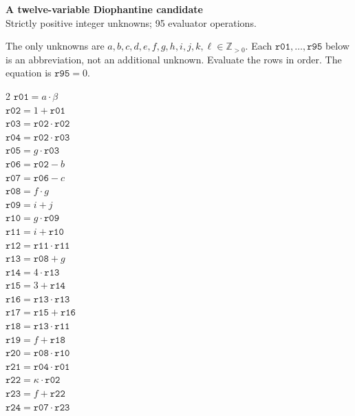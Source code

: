 \documentclass[9pt]{article}
\begin{document}
\begin{center}
{\large\bfseries A twelve-variable Diophantine candidate}\\
{\small Strictly positive integer unknowns; 95 evaluator operations.}
\end{center}
The only unknowns are \(a,b,c,d,e,f,g,h,i,j,k,\ell\in\mathbb Z_{>0}\).
Each \(\mathtt{r01},\ldots,\mathtt{r95}\) below is an abbreviation,
not an additional unknown. Evaluate the rows in order. The equation is
\(\boxed{\mathtt{r95}=0}\).

\begin{multicols}{2}\small
\(\mathtt{r01} = a \cdot \beta\)\\
\(\mathtt{r02} = 1 + \mathtt{r01}\)\\
\(\mathtt{r03} = \mathtt{r02} \cdot \mathtt{r02}\)\\
\(\mathtt{r04} = \mathtt{r02} \cdot \mathtt{r03}\)\\
\(\mathtt{r05} = g \cdot \mathtt{r03}\)\\
\(\mathtt{r06} = \mathtt{r02} - b\)\\
\(\mathtt{r07} = \mathtt{r06} - c\)\\
\(\mathtt{r08} = f \cdot g\)\\
\(\mathtt{r09} = i + j\)\\
\(\mathtt{r10} = g \cdot \mathtt{r09}\)\\
\(\mathtt{r11} = i + \mathtt{r10}\)\\
\(\mathtt{r12} = \mathtt{r11} \cdot \mathtt{r11}\)\\
\(\mathtt{r13} = \mathtt{r08} + g\)\\
\(\mathtt{r14} = 4 \cdot \mathtt{r13}\)\\
\(\mathtt{r15} = 3 + \mathtt{r14}\)\\
\(\mathtt{r16} = \mathtt{r13} \cdot \mathtt{r13}\)\\
\(\mathtt{r17} = \mathtt{r15} + \mathtt{r16}\)\\
\(\mathtt{r18} = \mathtt{r13} \cdot \mathtt{r11}\)\\
\(\mathtt{r19} = f + \mathtt{r18}\)\\
\(\mathtt{r20} = \mathtt{r08} \cdot \mathtt{r10}\)\\
\(\mathtt{r21} = \mathtt{r04} \cdot \mathtt{r01}\)\\
\(\mathtt{r22} = \kappa \cdot \mathtt{r02}\)\\
\(\mathtt{r23} = f + \mathtt{r22}\)\\
\(\mathtt{r24} = \mathtt{r07} \cdot \mathtt{r23}\)\\

\end{multicols}
\end{document}
